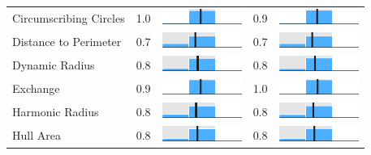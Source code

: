 \begin{table}
\begin{tabular}{l rm{7em} rm{7em}}
Circumscribing Circles &   1.0 &        \includegraphics[width=7em]{mini_hist/LA_2012_reock} &   0.9 &        \includegraphics[width=7em]{mini_hist/LA_2016_reock} \\
Distance to Perimeter  &   0.7 &     \includegraphics[width=7em]{mini_hist/LA_2012_rohrbach} &   0.7 &     \includegraphics[width=7em]{mini_hist/LA_2016_rohrbach} \\
Dynamic Radius         &   0.8 &   \includegraphics[width=7em]{mini_hist/LA_2012_dyn_radius} &   0.8 &   \includegraphics[width=7em]{mini_hist/LA_2016_dyn_radius} \\
Exchange               &   0.9 &     \includegraphics[width=7em]{mini_hist/LA_2012_exchange} &   1.0 &     \includegraphics[width=7em]{mini_hist/LA_2016_exchange} \\
Harmonic Radius        &   0.8 &  \includegraphics[width=7em]{mini_hist/LA_2012_harm_radius} &   0.8 &  \includegraphics[width=7em]{mini_hist/LA_2016_harm_radius} \\
Hull Area              &   0.8 &       \includegraphics[width=7em]{mini_hist/LA_2012_hull_a} &   0.8 &       \includegraphics[width=7em]{mini_hist/LA_2016_hull_a} \\

\end{tabular}
\end{table}
